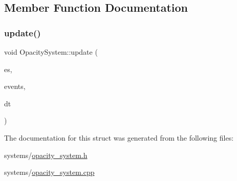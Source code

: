 \subsection{Member Function Documentation}
\mbox{\label{structOpacitySystem_afaf8a988027dcfe4320c119837d10515}} 
\subsubsection{\texorpdfstring{update()}{update()}}
{\footnotesize\ttfamily void Opacity\+System\+::update (\begin{DoxyParamCaption}\item[{entityx\+::\+Entity\+Manager \&}]{es,  }\item[{entityx\+::\+Event\+Manager \&}]{events,  }\item[{entityx\+::\+Time\+Delta}]{dt }\end{DoxyParamCaption})\hspace{0.3cm}{\ttfamily [override]}}



The documentation for this struct was generated from the following files\+:\begin{DoxyCompactItemize}
\item 
systems/\hyperlink{opacity__system_8h}{opacity\+\_\+system.\+h}\item 
systems/\hyperlink{opacity__system_8cpp}{opacity\+\_\+system.\+cpp}\end{DoxyCompactItemize}
